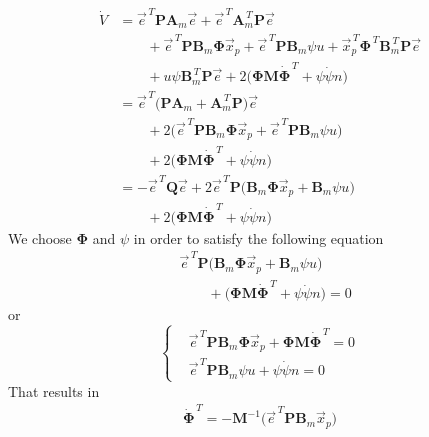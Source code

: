\documentclass[11pt,a4paper,oneside]{book}
\numberwithin{equation}{section}
\theoremstyle{it}
\theoremstyle{definition}
\begin{document}
\begin{equation}\label{eq_ctrl_9}
	\begin{aligned}
		\dot{V} &= \vec{e}^{\,T}\mathbf{P}\mathbf{A}_m\vec{e} +\vec{e}^{\,T}\mathbf{A}_m^{\,T}\mathbf{P}\vec{e} \\[6pt] & \qquad + \vec{e}^{\,T}\mathbf{P}\mathbf{B}_m\mathbf{\Phi}\vec{x}_p + \vec{e}^{\,T}\mathbf{P}\mathbf{B}_m\psi u + \vec{x}_p^{\,T}\mathbf{\Phi}^{\,T}\mathbf{B}_m^{\,T}\mathbf{P}\vec{e} \\[6pt] & \qquad + u\psi \mathbf{B}_m^{\,T}\mathbf{P}\vec{e}
		+2\Big(\mathbf{\Phi}\mathbf{M}\dot{\mathbf{\Phi}}^{\,T} + \psi\dot{\psi}n\Big)  \\[6pt]
		&= \vec{e}^{\,T}\Big(\mathbf{P}\mathbf{A}_m+\mathbf{A}_m^{\,T}\mathbf{P}\Big)\vec{e} \\[6pt] &\qquad+ 2\Big(\vec{e}^{\,T}\mathbf{P}\mathbf{B}_m\mathbf{\Phi}\vec{x}_p + \vec{e}^{\,T}\mathbf{P}\mathbf{B}_m\psi u\Big)\\[6pt]&\qquad+2\Big(\mathbf{\Phi}\mathbf{M}\dot{\mathbf{\Phi}}^{\,T} + \psi\dot{\psi}n\Big) \\[6pt]
		&= -\vec{e}^{\,T}\mathbf{Q}\vec{e} + 2\vec{e}^{\,T}\mathbf{P}\Big(\mathbf{B}_m\mathbf{\Phi}\vec{x}_p + \mathbf{B}_m\psi u\Big)\\[6pt]&\qquad+2\Big(\mathbf{\Phi}\mathbf{M}\dot{\mathbf{\Phi}}^{\,T} + \psi\dot{\psi}n\Big)
	\end{aligned}
\end{equation}
We choose $\mathbf{\Phi}$ and $\psi$ in order to satisfy the following equation
\begin{equation}
	\begin{aligned}
		&\vec{e}^{\,T}\mathbf{P}\Big(\mathbf{B}_m\mathbf{\Phi}\vec{x}_p + \mathbf{B}_m\psi u\Big)\\[6pt]&\qquad+\Big(\mathbf{\Phi}\mathbf{M}\dot{\mathbf{\Phi}}^{\,T} + \psi\dot{\psi}n\Big) = 0
	\end{aligned}
\end{equation}
or 
\begin{equation}
	\left\lbrace \begin{aligned}
		&\vec{e}^{\,T}\mathbf{P}\mathbf{B}_m\mathbf{\Phi}\vec{x}_p +\mathbf{\Phi}\mathbf{M}\dot{\mathbf{\Phi}}^{\,T} = 0 \\[8pt]
		&\vec{e}^{\,T}\mathbf{P}\mathbf{B}_m\psi u + \psi\dot{\psi}n = 0
	\end{aligned}\right. 
\end{equation}
That results in 
\begin{equation}
	\begin{aligned}
		\dot{\mathbf{\Phi}}^{\,T} = -\mathbf{M}^{-1}\Big(\vec{e}^{\,T}\mathbf{P}\mathbf{B}_m\vec{x}_p\Big)
	\end{aligned}
\end{equation}
\end{document}
